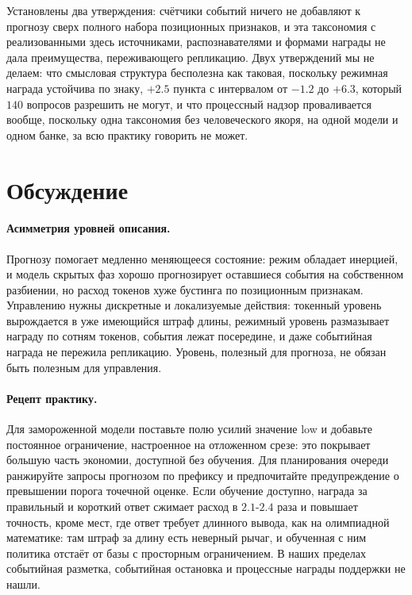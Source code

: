 \documentclass[11pt]{article}
\begin{document}
Установлены два утверждения: счётчики событий ничего не добавляют к прогнозу сверх полного набора позиционных признаков, и эта таксономия с реализованными здесь источниками, распознавателями и формами награды не дала преимущества, переживающего репликацию. Двух утверждений мы не делаем: что смысловая структура бесполезна как таковая, поскольку режимная награда устойчива по знаку, $+2.5$ пункта с интервалом от $-1.2$ до $+6.3$, который $140$ вопросов разрешить не могут, и что процессный надзор проваливается вообще, поскольку одна таксономия без человеческого якоря, на одной модели и одном банке, за всю практику говорить не может.

\section{Обсуждение}

\paragraph{Асимметрия уровней описания.} Прогнозу помогает медленно меняющееся состояние: режим обладает инерцией, и модель скрытых фаз хорошо прогнозирует оставшиеся события на собственном разбиении, но расход токенов хуже бустинга по позиционным признакам. Управлению нужны дискретные и локализуемые действия: токенный уровень вырождается в уже имеющийся штраф длины, режимный уровень размазывает награду по сотням токенов, события лежат посередине, и даже событийная награда не пережила репликацию. Уровень, полезный для прогноза, не обязан быть полезным для управления.

\paragraph{Рецепт практику.} Для замороженной модели поставьте полю усилий значение low и добавьте постоянное ограничение, настроенное на отложенном срезе: это покрывает большую часть экономии, доступной без обучения. Для планирования очереди ранжируйте запросы прогнозом по префиксу и предпочитайте предупреждение о превышении порога точечной оценке. Если обучение доступно, награда за правильный и короткий ответ сжимает расход в $2.1$-$2.4$ раза и повышает точность, кроме мест, где ответ требует длинного вывода, как на олимпиадной математике: там штраф за длину есть неверный рычаг, и обученная с ним политика отстаёт от базы с просторным ограничением. В наших пределах событийная разметка, событийная остановка и процессные награды поддержки не нашли.
\end{document}
